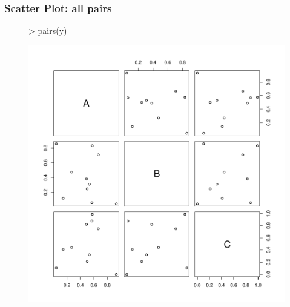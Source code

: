 \documentclass{beamer}
\begin{document}
\begin{frame}[containsverbatim]  
	\frametitle{Scatter Plot: all pairs}
\scriptsize
\begin{figure}
  \centering
\begin{Schunk}
\begin{Sinput}
> pairs(y) 
\end{Sinput}
\end{Schunk}
\includegraphics{fig--003}
\label{fig:base_scatter_all}
\end{figure}
\end{frame}
\end{document}
